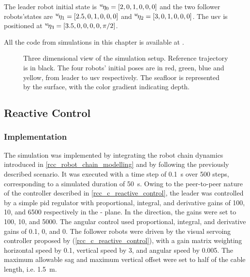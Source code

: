 The leader robot initial state is $\fldvect{\eta}{w}{0}=[2,0,1, 0, 0, 0]$ and the two follower
robots'states are $\fldvect{\eta}{w}{1}=[2.5,0,1, 0, 0, 0]$ and $\fldvect{\eta}{w}{2}=[3,0,1, 0, 0,
	0]$. The \ac{usv} is positioned at $\fldvect{\eta}{w}{3}=[3.5,0,0,0,0,\pi/2]$.

All the code from simulations in this chapter is available at .

\begin{figure}
	\centering
	\caption{
		Three dimensional view of the simulation setup. Reference trajectory is in black. The four
		robots' initial poses are in red, green, blue and yellow, from leader to \ac{usv} respectively.
		The seafloor is represented by the surface, with the color gradient indicating depth.
	}
	\label{rcc_s_mpc_ss_tank}
\end{figure}

\subsection{Reactive Control}
\label{rcc_s_reactive_control}

\subsubsection{Implementation}
\label{rcc_s_rc_implementation}

The simulation was implemented by integrating the robot chain dynamics introduced in
\cref{rcc_robot_chain_modelling} and by following the previously described scenario. It was
executed with a time step of \qty{0.1}{\second} over \num{500} steps, corresponding to a simulated
duration of \qty{50}{\second}. Owing to the peer-to-peer nature of the controller described in
\cref{rcc_c_reactive_control}, the leader was controlled by a simple \ac{pid} regulator with
proportional, integral, and derivative gains of \num{100}, \num{10}, and \num{6500} respectively in
the - plane. In the  direction, the gains were set to \num{100}, \num{10},
and \num{5000}. The angular control used proportional, integral, and derivative gains of \num{0.1},
\num{0}, and \num{0}. The follower robots were driven by the visual servoing controller proposed by
\cite{laranjeiraCatenarybasedVisualServoing2020} (\cref{rcc_c_reactive_control}), with a gain
matrix weighting horizontal speed by \num{0.1}, vertical speed by \num{3}, and angular speed by
\num{0.005}. The maximum allowable sag  and maximum vertical offset
 were set to half of the cable length, i.e. \qty{1.5}{\m}.

